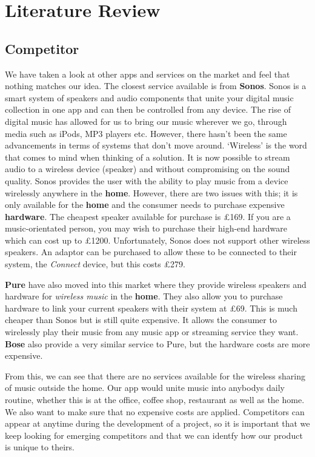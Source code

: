 \section{Literature Review}


\subsection{\textbf{Competitor}}
    We have taken a look at other apps and services on the market and feel that nothing matches our idea. The closest service available is from \textbf{Sonos}. Sonos is a smart system of speakers and audio components that unite your digital music collection in one app and can then be controlled from any device. The rise of digital music has allowed for us to bring our music wherever we go, through media such as iPods, MP3 players etc. However, there hasn't been the same advancements in terms of systems that don't move around. `Wireless' is the word that comes to mind when thinking of a solution. It is now possible to stream audio to a wireless device (speaker) and without compromising on the sound quality. Sonos provides the user with the ability to play music from a device wirelessly anywhere in the \textbf{home}. However, there are two issues with this; it is only available for the \textbf{home} and the consumer needs to purchase expensive \textbf{hardware}. The cheapest speaker available for purchase is \pounds169. If you are a music-orientated person, you may wish to purchase their high-end hardware which can cost up to \pounds1200. Unfortunately, Sonos does not support other wireless speakers. An adaptor can be purchased to allow these to be connected to their system, the \emph{Connect} device, but this costs \pounds279.  

    \textbf{Pure} have also moved into this market where they provide wireless speakers and hardware for \emph{wireless music} in the \textbf{home}. They also allow you to purchase hardware to link your current speakers with their system at \pounds69.  This is much cheaper than Sonos but is still quite expensive. It allows the consumer to wirelessly play their music from any music app or streaming service they want. \textbf{Bose} also provide a very similar service to Pure, but the hardware costs are more expensive.

    From this, we can see that there are no services available for the wireless sharing of music outside the home. Our app would unite music into anybodys daily routine, whether this is at the office, coffee shop, restaurant as well as the home. We also want to make sure that no expensive costs are applied.
    Competitors can appear at anytime during the development of a project, so it is important that we keep looking for emerging competitors and that we can identfy how our product is unique to theirs. 

